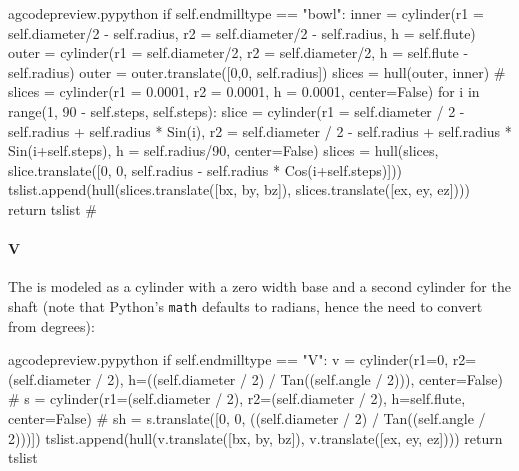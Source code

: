 \documentclass{ltxdoc}
\begin{document}
\lstset{firstnumber=\thegcpy}
\begin{writecode}{a}{gcodepreview.py}{python}
        if self.endmilltype == "bowl":
            inner = cylinder(r1 = self.diameter/2 - self.radius, r2 = self.diameter/2 - self.radius, h = self.flute)
            outer = cylinder(r1 = self.diameter/2, r2 = self.diameter/2, h = self.flute - self.radius)
            outer = outer.translate([0,0, self.radius])
            slices = hull(outer, inner)
#    slices = cylinder(r1 = 0.0001, r2 = 0.0001, h = 0.0001, center=False)
            for i in range(1, 90 - self.steps, self.steps):
                slice = cylinder(r1 = self.diameter / 2 - self.radius + self.radius * Sin(i), r2 = self.diameter / 2 - self.radius + self.radius * Sin(i+self.steps), h = self.radius/90, center=False)
                slices = hull(slices, slice.translate([0, 0, self.radius - self.radius * Cos(i+self.steps)]))
            tslist.append(hull(slices.translate([bx, by, bz]), slices.translate([ex, ey, ez])))
            return tslist
#
\end{writecode}
\addtocounter{gcpy}{23}

\paragraph{V}

The  is modeled as a cylinder with a zero width base and a second cylinder for the shaft (note that Python's \verb|math| defaults to radians, hence the need to convert from degrees):

%

\lstset{firstnumber=\thegcpy}
\begin{writecode}{a}{gcodepreview.py}{python}
        if self.endmilltype == "V":
            v = cylinder(r1=0, r2=(self.diameter / 2), h=((self.diameter / 2) / Tan((self.angle / 2))), center=False)
#                s = cylinder(r1=(self.diameter / 2), r2=(self.diameter / 2), h=self.flute, center=False)
#                sh = s.translate([0, 0, ((self.diameter / 2) / Tan((self.angle / 2)))])
            tslist.append(hull(v.translate([bx, by, bz]), v.translate([ex, ey, ez])))
            return tslist

\end{writecode}
\addtocounter{gcpy}{23}
\end{document}
